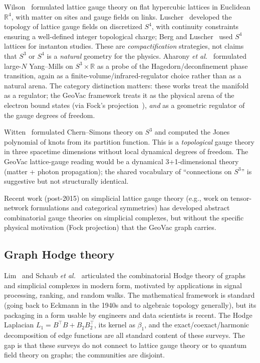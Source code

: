 \documentclass[aps,pra,twocolumn,superscriptaddress,longbibliography]{revtex4-2}
\begin{document}
Wilson~\cite{Wilson1974} formulated lattice gauge theory on flat
hypercubic lattices in Euclidean $\mathbb{R}^4$, with matter on sites
and gauge fields on links.  Luscher~\cite{Luscher1982} developed the
topology of lattice gauge fields on discretized $S^4$, with
continuity constraints ensuring a well-defined integer topological
charge; Berg and Luscher~\cite{BergLuscher1981} used $S^4$ lattices
for instanton studies.  These are \emph{compactification} strategies,
not claims that $S^3$ or $S^4$ is a \emph{natural} geometry for the
physics.  Aharony \emph{et al.}~\cite{Aharony2004} formulated large-$N$
Yang--Mills on $S^3 \times \mathbb{R}$ as a probe of the
Hagedorn/deconfinement phase transition, again as a
finite-volume/infrared-regulator choice rather than as a natural
arena.  The category distinction matters: these works treat the
manifold as a regulator; the GeoVac framework treats it as the
physical arena of the electron bound states (via Fock's
projection~\cite{Fock1935}), \emph{and} as a geometric regulator of
the gauge degrees of freedom.

Witten~\cite{Witten1989} formulated Chern--Simons theory on $S^3$ and
computed the Jones polynomial of knots from its partition function.
This is a \emph{topological} gauge theory in three spacetime
dimensions without local dynamical degrees of freedom.  The GeoVac
lattice-gauge reading would be a dynamical 3+1-dimensional theory
(matter + photon propagation); the shared vocabulary of
``connections on $S^3$'' is suggestive but not structurally identical.

Recent work (post-2015) on simplicial lattice gauge theory
(e.g., work on tensor-network formulations and categorical
symmetries) has developed abstract combinatorial gauge theories on
simplicial complexes, but without the specific physical motivation
(Fock projection) that the GeoVac graph carries.

\subsection{Graph Hodge theory}

Lim~\cite{Lim2020} and Schaub \emph{et al.}~\cite{Schaub2020}
articulated the combinatorial Hodge theory of graphs and simplicial
complexes in modern form, motivated by applications in signal
processing, ranking, and random walks.  The mathematical framework is
standard (going back to Eckmann in the 1940s and to algebraic
topology generally), but its packaging in a form usable by
engineers and data scientists is recent.  The Hodge Laplacian
$L_1 = B^{\top} B + B_2 B_2^{\top}$, its kernel as $\beta_1$, and
the exact/coexact/harmonic decomposition of edge functions are all
standard content of these surveys.  The gap is that these surveys do
not connect to lattice gauge theory or to quantum field theory on
graphs; the communities are disjoint.
\end{document}
